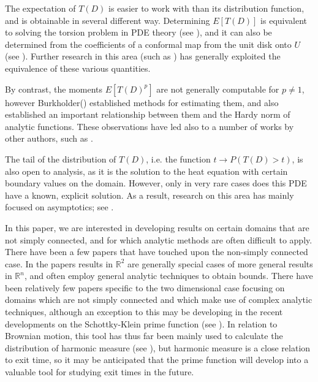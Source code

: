 \documentclass[a4paper, oneside, 12pt]{amsart}
\newcommand{\citep}{\cite}
\newcommand{\RR}{\mathbb{R}}
\begin{document}
The expectation of $T(D)$ is easier to work with than its distribution
function, and is obtainable in several different way. Determining $E[T(D)]$ is equivalent to
solving the torsion problem in PDE theory (see \citep{banuelos2002torsional}), and
it can also be determined from the coefficients of a conformal map from the
unit disk onto $U$ (see \citep{banuelosdrum}). Further research in this area
(such as \citep{banuelos1993conditioned,banuelos2024conjecture,carroll2001old,
coffee, meecp}) has generally exploited the equivalence of these various
quantities.

By contrast, the moments $E[T(D)^p]$ are not generally computable for $p \neq
1$, however Burkholder(\citep{burk}) established methods for estimating them,
and also established an important relationship between them and the Hardy norm
of analytic functions. These observations have led also to a number of works by
other authors, such as
\citep{banuelos2005sharp,banuelos2020bounds,carroll2006brownian,kim2021quantitative,mecomb,mejmaa,usexitmax}.

The tail of the distribution of $T(D)$, i.e. the function $t \to P(T(D)>t)$, is also
open to analysis, as it is the solution to the heat equation with certain
boundary values on the domain. However, only in very rare cases does this PDE
have a known, explicit solution. As a result, research on this area has mainly focused on asymptotics; see \cite{deblassie1987exit, banuelos2001first, betsakos2022duration, dimitri, de1988remark, banuelos1997brownian}.

In this paper, we are interested in developing results on certain domains that
are not simply connected, and for which analytic methods are often difficult to
apply. There have been a few papers that have touched upon the non-simply
connected case. In the papers \citep{banuelos2002torsional, banuelos2020bounds,
betsakos2022duration, kim2021quantitative} results in
$\RR^2$ are generally special cases of more general results in $\RR^n$, and often
employ general analytic techniques to obtain bounds. There have been relatively few papers specific to the two dimensional case focusing on domains which are not simply connected and which make use of complex analytic techniques, although an exception to this may be developing in the recent developments on the Schottky-Klein prime function (see \cite{crowdy2020solving,crowdy2016schottky}). In relation to Brownian motion, this tool has thus far been mainly used to calculate the distribution of harmonic measure (see \cite{mahenthiram2024harmonic, mahenthiram2025computing, green2022harmonic,snipes2016harmonic, barton2014new, snipes2005realizing, snipes2008convergence, green2024towards}), but harmonic measure is a close relation to exit time, so it may be anticipated that the prime function will develop into a valuable tool for studying exit times in the future.
\end{document}
